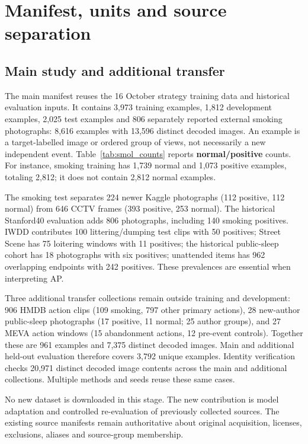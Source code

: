 
\section{Manifest, units and source separation}
\subsection{Main study and additional transfer}
The main manifest reuses the 16 October strategy training data and historical evaluation inputs. It contains 3,973 training examples, 1,812 development examples, 2,025 test examples and 806 separately reported external smoking photographs: 8,616 examples with 13,596 distinct decoded images. An example is a target-labelled image or ordered group of views, not necessarily a new independent event. Table~\ref{tab:smol_counts} reports \textbf{normal/positive} counts. For instance, smoking training has 1,739 normal and 1,073 positive examples, totaling 2,812; it does not contain 2,812 normal examples.


The smoking test separates 224 newer Kaggle photographs (112 positive, 112 normal) from 646 CCTV frames (393 positive, 253 normal). The historical Stanford40 evaluation adds 806 photographs, including 140 smoking positives. IWDD contributes 100 littering/dumping test clips with 50 positives; Street Scene has 75 loitering windows with 11 positives; the historical public-sleep cohort has 18 photographs with six positives; unattended items has 962 overlapping endpoints with 242 positives. These prevalences are essential when interpreting AP.

Three additional transfer collections remain outside training and development: 906 HMDB action clips (109 smoking, 797 other primary actions), 28 new-author public-sleep photographs (17 positive, 11 normal; 25 author groups), and 27 MEVA action windows (15 abandonment actions, 12 pre-event controls). Together these are 961 examples and 7,375 distinct decoded images. Main and additional held-out evaluation therefore covers 3,792 unique examples. Identity verification checks 20,971 distinct decoded image contents across the main and additional collections. Multiple methods and seeds reuse these same cases.

No new dataset is downloaded in this stage. The new contribution is model adaptation and controlled re-evaluation of previously collected sources. The existing source manifests remain authoritative about original acquisition, licenses, exclusions, aliases and source-group membership.

